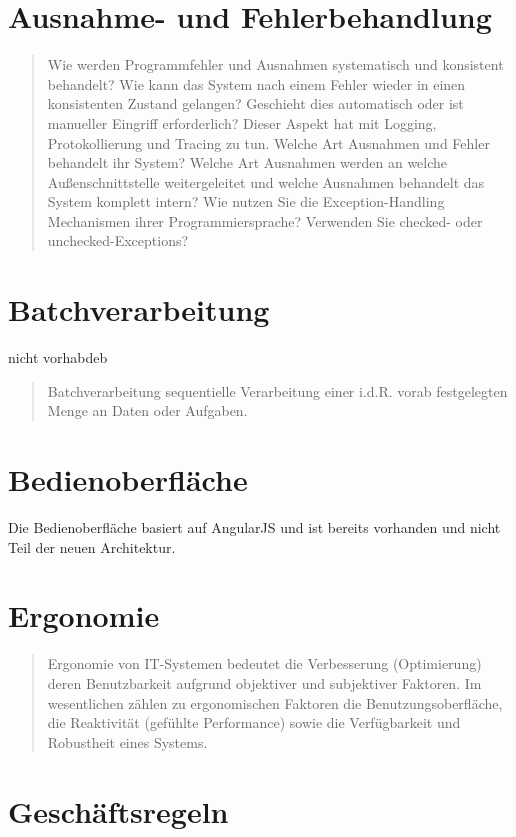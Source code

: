 \section{Ausnahme- und Fehlerbehandlung}

\begin{quote}
	Wie werden Programmfehler und Ausnahmen systematisch und konsistent behandelt?
	Wie kann das System nach einem Fehler wieder in einen konsistenten Zustand gelangen? Geschieht dies automatisch oder ist manueller Eingriff erforderlich? Dieser Aspekt hat mit Logging, Protokollierung und Tracing zu tun.
	Welche Art Ausnahmen und Fehler behandelt ihr System? Welche Art Ausnahmen werden an welche Außenschnittstelle weitergeleitet und welche Ausnahmen behandelt das System komplett intern? Wie nutzen Sie die Exception-Handling Mechanismen ihrer Programmiersprache? Verwenden Sie checked- oder unchecked-Exceptions?
\end{quote}

\section{Batchverarbeitung}

nicht vorhabdeb

\begin{quote}
	Batchverarbeitung sequentielle Verarbeitung einer i.d.R. vorab festgelegten Menge an Daten oder Aufgaben.
\end{quote}

\section{Bedienoberfläche}

Die Bedienoberfläche basiert auf AngularJS und ist bereits vorhanden und nicht Teil der neuen Architektur.

\section{Ergonomie}

\begin{quote}
	Ergonomie von IT-Systemen bedeutet die Verbesserung (Optimierung) deren Benutzbarkeit aufgrund objektiver und subjektiver Faktoren. Im wesentlichen zählen zu ergonomischen Faktoren die Benutzungsoberfläche, die Reaktivität (gefühlte Performance) sowie die Verfügbarkeit und Robustheit eines Systems.
\end{quote}

\section{Geschäftsregeln}

